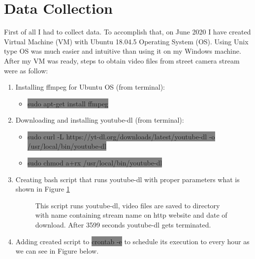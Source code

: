 \section{Data Collection}
\label{sec:collection}
First of all I had to collect data. To accomplish that, on June 2020 I have created Virtual Machine (VM) with Ubuntu 18.04.5 Operating System (OS). Using Unix type OS was much easier and intuitive than using it on my Windows machine. After my VM was ready, steps to obtain video files from street camera stream were as follow:
\begin{enumerate}
    \item Installing ffmpeg for Ubuntu OS (from terminal):
    \begin{itemize}
        \item \colorbox{Gray}{sudo apt-get install ffmpeg}
    \end{itemize}
    \item Downloading and installing youtube-dl (from terminal):
    \begin{itemize}
        \item \colorbox{Gray}{sudo curl -L https://yt-dl.org/downloads/latest/youtube-dl -o /usr/local/bin/youtube-dl}
        \item \colorbox{Gray}{sudo chmod a+rx /usr/local/bin/youtube-dl}
    \end{itemize}
    \item Creating bash script that runs youtube-dl with proper parameters what is shown in Figure \ref{fig:script}
    \begin{figure}[H]
        \centering
        \caption{This script runs youtube-dl, video files are saved to  directory with name containing stream name on http website and date of download. After 3599 seconds youtube-dl gets terminated.}
        \label{fig:script}
    \end{figure}
    \item Adding created script to \colorbox{Gray}{crontab -e} to schedule its execution to every hour as we can see in Figure below.
    \begin{figure}[H]
        \centering

\end{figure}
\end{enumerate}

